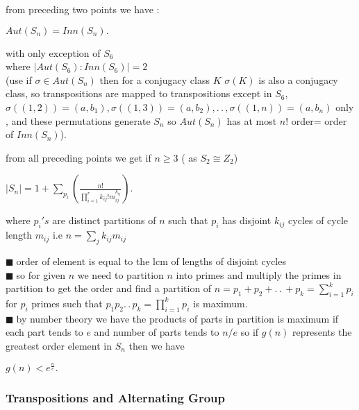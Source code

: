 \documentclass[11pt]{extarticle}
\newcommand{\ck}{.\,.\,}
\newcommand{\sm}[2]{\displaystyle\sum_{#1}^{#2}}
\newcommand{\snote}[1]{{\footnotesize(#1)}}
\newcommand{\y}{$\blacksquare\;$}
\newcommand{\tbx}[2][]{
	\begin{tcolorbox}[enhanced,breakable,size=small,colback=black!2!white,title={#1},arc is angular, arc=1.5mm,drop fuzzy shadow]
		#2
	\end{tcolorbox}
}
\begin{document}
\begin{multicols}{2}
{	}
		\tbx{from preceding two points we have :
		\begin{center}
			$ Aut(S_n)=Inn(S_n) .$
		\end{center} with only exception of $ S_6 $ \\ where $ |Aut(S_6):Inn(S_6)|=2 $ \\
		{ \footnotesize (use if $ \sigma \in Aut(S_n) $ then for a conjugacy class $ K $ $ \sigma(K) $ is also a conjugacy class, so transpositions are mapped to transpositions except in $ S_6 $, $ \sigma((1,2))=(a,b_1), \sigma((1,3))=(a,b_2),\ck, \sigma ((1,n))=(a,b_n)$ only , and these permutations generate $ S_n $ so $ Aut(S_n) $ has at most $ n! $ order= order of $ Inn(S_n) $).}}
		
	\tbx[Class equation]{ from all preceding points we get if $ n\geq 3 $ \snote{ as $ S_2\cong Z_2 $}
	\begin{center}
		$ |S_n|= 1+\sum\limits_{p_i}\left(\frac{ n! }{\prod_{i=1}^{r}k_{ij}!m_{ij}^{k_{ij}}}\right).$ 
		\end{center}  
	where $ p_i's $ are distinct partitions of $ n $ such that $ p_ i$ has disjoint $ k_{ij} $ cycles of cycle length $ m_{ij} $ i.e $ n=\sum_j k_{ij}m_{ij}$ }
	\tbx[Greatest order element in $ S_n $ ]{
	\y order of element is equal to the lcm of lengths of disjoint cycles \\
	 \y so for given $ n $ we need to partition $ n $ into primes and multiply the primes in partition to get the order and find a partition of $ n=p_1+p_2+\ck +p_k =\sm{i=1}{k}p_i$ for $ p_i $ primes such that 
	 $ p_1p_2\ck p_k=\prod\limits_{i=1}^{k}p_i$ is maximum.\\
	 \y by number theory we have the products of parts in partition is maximum if each part tends to $ e $ and number of parts tends to $ n/e $ so if $ g(n) $ represents the greatest order element in $ S_n $  then we have 
	 \begin{center}\large
	 	$ g(n)<e^{\frac{ n }{e}  } .$
	 	\end{center}  }

	\subsubsection{Transpositions and Alternating Group} 
	

\end{multicols}
\end{document}
